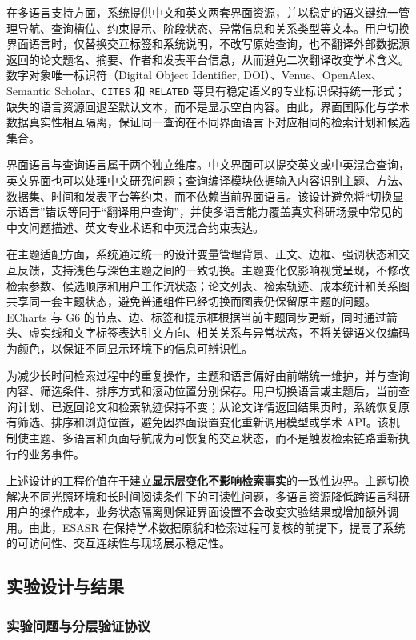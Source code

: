 \documentclass[a4paper,12pt,fontset=none]{ctexart}
\begin{document}
在多语言支持方面，系统提供中文和英文两套界面资源，并以稳定的语义键统一管理导航、查询槽位、约束提示、阶段状态、异常信息和关系类型等文本。用户切换界面语言时，仅替换交互标签和系统说明，不改写原始查询，也不翻译外部数据源返回的论文题名、摘要、作者和发表平台信息，从而避免二次翻译改变学术含义。数字对象唯一标识符（Digital Object Identifier, DOI）、Venue、OpenAlex、Semantic Scholar、\texttt{CITES} 和 \texttt{RELATED} 等具有稳定语义的专业标识保持统一形式；缺失的语言资源回退至默认文本，而不是显示空白内容。由此，界面国际化与学术数据真实性相互隔离，保证同一查询在不同界面语言下对应相同的检索计划和候选集合。

界面语言与查询语言属于两个独立维度。中文界面可以提交英文或中英混合查询，英文界面也可以处理中文研究问题；查询编译模块依据输入内容识别主题、方法、数据集、时间和发表平台等约束，而不依赖当前界面语言。该设计避免将“切换显示语言”错误等同于“翻译用户查询”，并使多语言能力覆盖真实科研场景中常见的中文问题描述、英文专业术语和中英混合约束表达。

在主题适配方面，系统通过统一的设计变量管理背景、正文、边框、强调状态和交互反馈，支持浅色与深色主题之间的一致切换。主题变化仅影响视觉呈现，不修改检索参数、候选顺序和用户工作流状态；论文列表、检索轨迹、成本统计和关系图共享同一套主题状态，避免普通组件已经切换而图表仍保留原主题的问题。ECharts 与 G6 的节点、边、标签和提示框根据当前主题同步更新，同时通过箭头、虚实线和文字标签表达引文方向、相关关系与异常状态，不将关键语义仅编码为颜色，以保证不同显示环境下的信息可辨识性。

为减少长时间检索过程中的重复操作，主题和语言偏好由前端统一维护，并与查询内容、筛选条件、排序方式和滚动位置分别保存。用户切换语言或主题后，当前查询计划、已返回论文和检索轨迹保持不变；从论文详情返回结果页时，系统恢复原有筛选、排序和浏览位置，避免因界面设置变化重新调用模型或学术 API。该机制使主题、多语言和页面导航成为可恢复的交互状态，而不是触发检索链路重新执行的业务事件。

上述设计的工程价值在于建立\textbf{显示层变化不影响检索事实}的一致性边界。主题切换解决不同光照环境和长时间阅读条件下的可读性问题，多语言资源降低跨语言科研用户的操作成本，业务状态隔离则保证界面设置不会改变实验结果或增加额外调用。由此，ESASR 在保持学术数据原貌和检索过程可复核的前提下，提高了系统的可访问性、交互连续性与现场展示稳定性。

\subsection{实验设计与结果}

\subsubsection{实验问题与分层验证协议}
\end{document}

